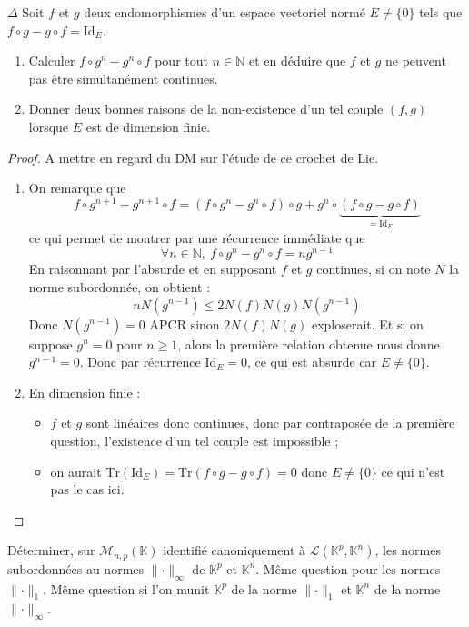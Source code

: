 \documentclass[french,a4paper]{article}
\newcommand{\N}{\mathbb{N}}
\newcommand{\K}{\mathbb{K}}
\newcommand{\Tr}{\text{Tr}}
\theoremstyle{plain}
\theoremstyle{definition}
\theoremstyle{remark}
\begin{document}
\begin{ex}[Moulin.33]{$\Delta$}
	Soit $f$ et $g$ deux endomorphismes d'un espace vectoriel normé $E\ne\{0\}$ tels que $f\circ g-g\circ f=\text{Id}_E$.
	\begin{enumerate}
		\item Calculer $f\circ g^n-g^n\circ f$ pour tout $n\in\N$ et en déduire que $f$ et $g$ ne peuvent pas être simultanément continues.
		\item Donner deux bonnes raisons de la non-existence d'un tel couple $(f,g)$ lorsque $E$ est de dimension finie.
	\end{enumerate}
\end{ex}
\begin{proof}
	A mettre en regard du DM sur l'étude de ce crochet de Lie.
	\begin{enumerate}
		\item On remarque que $$f\circ g^{n+1}-g^{n+1}\circ f=(f\circ g^n-g^n\circ f)\circ g+g^n\circ \underbrace{(f\circ g-g\circ f)}_{=\text{Id}_E}$$ ce qui permet de montrer par une récurrence immédiate que $$\forall n\in\N,\ f\circ g^n-g^n\circ f=ng^{n-1}$$ En raisonnant par l'absurde et en supposant  $f$ et $g$ continues, si on note $N$ la norme subordonnée, on obtient :  $$nN(g^{n-1})\leqslant2N(f)N(g)N(g^{n-1})$$ Donc $N(g^{n-1})=0$ APCR sinon $2N(f)N(g)$ exploserait. Et si on suppose $g^{n}=0$ pour $n\geqslant 1$, alors la première relation obtenue nous donne $g^{n-1}=0$. Donc par récurrence $\text{Id}_E=0$, ce qui est absurde car $E\ne\{0\}$.
		\item En dimension finie :
		\begin{itemize}
			\item $f$ et $g$ sont linéaires donc continues, donc par contraposée de la première question, l'existence d'un tel couple est impossible ;
			\item on aurait $\Tr(\text{Id}_E)=\Tr(f\circ g-g\circ f)=0$ donc $E\ne\{0\}$ ce qui n'est pas le cas ici.
		\end{itemize}
	\end{enumerate}
\end{proof}

\begin{ex}[Moulin.34]{}
	Déterminer, sur $\mathcal{M}_{n,p}(\K)$ identifié canoniquement à $\mathcal{L}(\K^p,\K^n)$, les normes subordonnées au normes $\lVert\cdot\rVert_\infty$ de $\K^p$ et $\K^n$. Même question pour les normes $\lVert\cdot\rVert_1$. Même question si l'on munit $\K^p$ de la norme $\lVert\cdot\rVert_1$ et $\K^n$ de la norme $\lVert\cdot\rVert_\infty$.
\end{ex}
\end{document}
